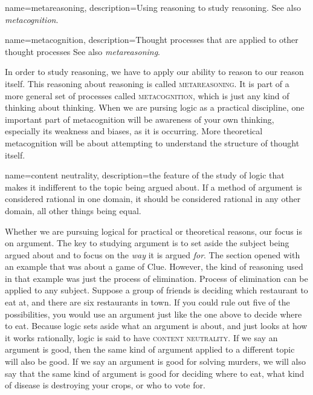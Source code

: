 {
name=metareasoning,
description={Using reasoning to study reasoning. See also \emph{metacognition}.}
}

{
name=metacognition,
description={Thought processes that are applied to other thought processes See also \emph{metareasoning}.}
}

In order to study reasoning, we have to apply our ability to reason to our reason itself. This reasoning about reasoning is called \textsc{\gls{metareasoning}}\label{def:metareasoning}. It is part of a more general set of processes called \textsc{\gls{metacognition}}\label{def:metacognition}, which is just any kind of thinking about thinking. When we are pursing logic as a practical discipline, one important part of metacognition will be awareness of your own thinking, especially its weakness and biases, as it is occurring. More theoretical metacognition will be about attempting to understand the structure of thought itself.


{
name=content neutrality,
description={the feature of the study of logic that makes it indifferent to the topic being argued about. If a method of argument is considered rational in one domain, it should be considered rational in any other domain, all other things being equal.}
}

Whether we are pursuing logical for practical or theoretical reasons, our focus is on argument. The key to studying argument is to set aside the subject being argued about and to focus on the \emph{way} it is argued \emph{for}. The section opened with an example that was about a game of Clue. However, the kind of reasoning used in that example was just the process of elimination. Process of elimination can be applied to any subject. Suppose a group of friends is deciding which restaurant to eat at, and there are six restaurants in town. If you could rule out five of the possibilities, you would use an argument just like the one above to decide where to eat. Because logic sets aside what an argument is about, and just looks at how it works rationally, logic is said to have \textsc{\gls{content neutrality}}. \label{def:content_neutrality} If we say an argument is good, then the same kind of argument applied to a different topic will also be good.  If we say an argument is good for solving murders, we will also say that the same kind of argument is good for deciding where to eat, what kind of disease is destroying your crops, or who to vote for.

